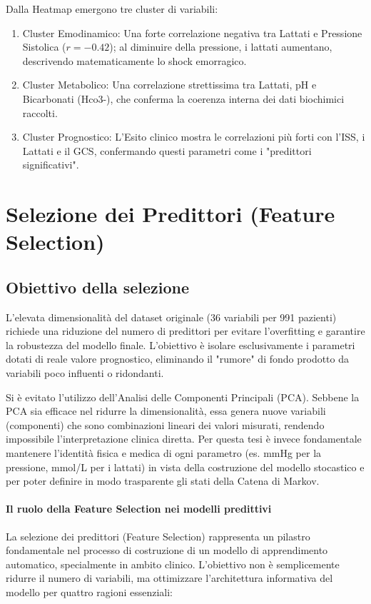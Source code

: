 \documentclass[11pt, oneside, noexaminfo]{sapthesis}   	%
\begin{document}
Dalla Heatmap emergono tre cluster di variabili:
\begin{enumerate}
\item Cluster Emodinamico: Una forte correlazione negativa tra Lattati e Pressione Sistolica ($r = - 0.42$); al diminuire della pressione, i lattati aumentano, descrivendo matematicamente lo shock emorragico.
\item Cluster Metabolico: Una correlazione strettissima tra Lattati, pH e Bicarbonati (Hco3-), che conferma la coerenza interna dei dati biochimici raccolti.
\item Cluster Prognostico: L'Esito clinico mostra le correlazioni più forti con l'ISS, i Lattati e il GCS, confermando questi parametri come i "predittori significativi".
\end{enumerate}


\chapter{Selezione dei Predittori (Feature Selection)}

\section{Obiettivo della selezione}
L’elevata dimensionalità del dataset originale (36 variabili per 991 pazienti) richiede una riduzione del numero di predittori per evitare l'overfitting e garantire la robustezza del modello finale. L'obiettivo è isolare esclusivamente i parametri dotati di reale valore prognostico, eliminando il "rumore" di fondo prodotto da variabili poco influenti o ridondanti.

Si è evitato l'utilizzo dell'Analisi delle Componenti Principali (PCA). Sebbene la PCA sia efficace nel ridurre la dimensionalità, essa genera nuove variabili (componenti) che sono combinazioni lineari dei valori misurati, rendendo impossibile l'interpretazione clinica diretta. Per questa tesi è invece fondamentale mantenere l'identità fisica e medica di ogni parametro (es. mmHg per la pressione, mmol/L per i lattati) in vista della costruzione del modello stocastico e per poter definire in modo trasparente gli stati della Catena di Markov.

\subsubsection{Il ruolo della Feature Selection nei modelli predittivi}
La selezione dei predittori (Feature Selection) rappresenta un pilastro fondamentale nel processo di costruzione di un modello di apprendimento automatico, specialmente in ambito clinico. L'obiettivo non è semplicemente ridurre il numero di variabili, ma ottimizzare l'architettura informativa del modello per quattro ragioni essenziali:
\end{document}
